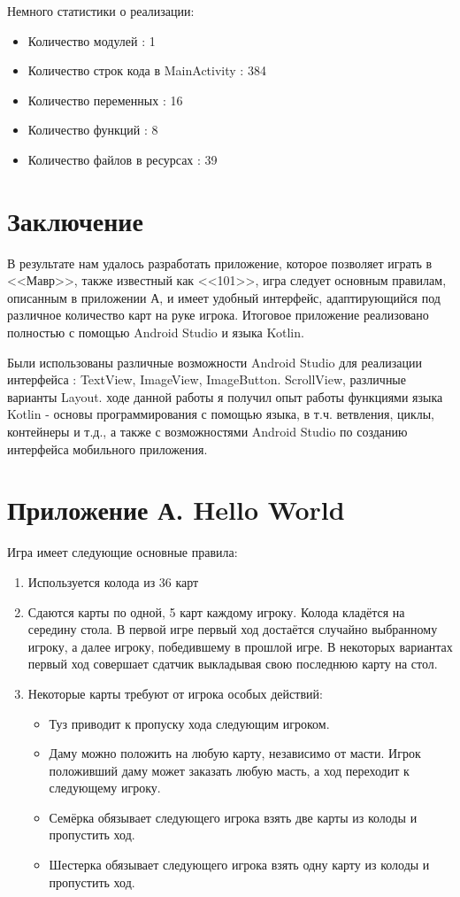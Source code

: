 \documentclass[a4paper,12pt]{article}
\begin{document}
Немного статистики о реализации:
\begin{itemize}
    \item Количество модулей : 1
    \item Количество строк кода в MainActivity : 384
    \item Количество переменных : 16
    \item Количество функций : 8
    \item Количество файлов в ресурсах : 39
\end{itemize}

\newpage
\section*{Заключение}
В результате нам удалось разработать приложение, которое позволяет играть в <<Мавр>>, также известный как <<101>>, игра следует основным правилам, описанным в приложении А, и имеет удобный интерфейс, адаптирующийся под различное количество карт на руке игрока. Итоговое приложение реализовано полностью с помощью Android Studio и языка Kotlin. 

Были использованы различные возможности Android Studio для реализации интерфейса : TextView, ImageView, ImageButton. ScrollView, различные варианты Layout.
 ходе данной работы я получил опыт работы функциями языка Kotlin - основы программирования с помощью языка, в т.ч. ветвления, циклы, контейнеры и т.д., а также с возможностями Android Studio по созданию интерфейса мобильного приложения.

\newpage

\section*{Приложение А. Hello World}
Игра имеет следующие основные правила: 
\begin{enumerate}
    \item Используется колода из 36 карт
    \item Сдаются карты по одной, 5 карт каждому игроку. Колода кладётся на середину стола. В первой игре первый ход достаётся случайно выбранному игроку, а далее игроку, победившему в прошлой игре. В некоторых вариантах первый ход совершает сдатчик выкладывая свою последнюю карту на стол.
    \item Некоторые карты требуют от игрока особых действий: \begin{itemize}
        \item Туз приводит к пропуску хода следующим игроком.
        \item Даму можно положить на любую карту, независимо от масти. Игрок положивший даму может заказать любую масть, а ход переходит к следующему игроку.
        \item Семёрка обязывает следующего игрока взять две карты из колоды и пропустить ход.
        \item Шестерка обязывает следующего игрока взять одну карту из колоды и пропустить ход.
        
    \end{itemize}
\end{enumerate}
\end{document}
